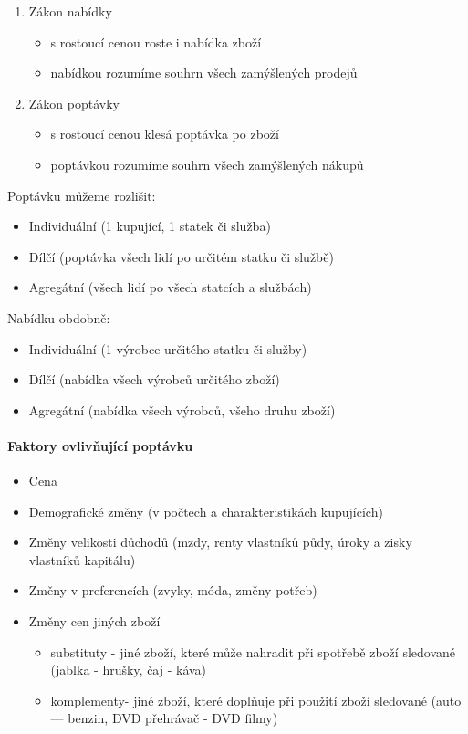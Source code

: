 \begin{enumerate}
    \item Zákon nabídky
    \begin{itemize}
        \item s rostoucí cenou roste i nabídka zboží
        \item nabídkou rozumíme souhrn všech zamýšlených prodejů
    \end{itemize}
    \item Zákon poptávky
    \begin{itemize}
        \item s rostoucí cenou klesá poptávka po zboží
        \item poptávkou rozumíme souhrn všech zamýšlených nákupů
    \end{itemize}
\end{enumerate}

Poptávku můžeme rozlišit:
\begin{itemize}
    \item Individuální (1 kupující, 1 statek či služba)
    \item Dílčí (poptávka všech lidí po určitém statku či službě)
    \item Agregátní (všech lidí po všech statcích a službách)
\end{itemize}

Nabídku obdobně:
\begin{itemize}
    \item Individuální (1 výrobce určitého statku či služby)
    \item Dílčí (nabídka všech výrobců určitého zboží)
    \item Agregátní (nabídka všech výrobců, všeho druhu zboží)
\end{itemize}

\paragraph*{Faktory ovlivňující poptávku}
\begin{itemize}
    \item Cena
    \item Demografické změny (v počtech a charakteristikách kupujících)
    \item Změny velikosti důchodů (mzdy, renty vlastníků půdy, úroky a zisky vlastníků kapitálu)
    \item Změny v preferencích (zvyky, móda, změny potřeb)
    \item Změny cen jiných zboží
    \begin{itemize}
        \item substituty - jiné zboží, které může nahradit při spotřebě zboží sledované (jablka - hrušky, čaj - káva)
        \item komplementy- jiné zboží, které doplňuje při použití zboží sledované (auto — benzin, DVD přehrávač - DVD filmy)
    \end{itemize}
\end{itemize}

